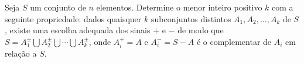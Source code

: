 Seja $S$ um conjunto de $n$ elementos.
Determine o menor inteiro positivo $k$ com a seguinte propriedade: dados quaisquer $k$ subconjuntos distintos $A_1, A_2, \dots, A_k$ de $S$, existe uma escolha adequada dos sinais $+$ e $-$ de modo que $S = A_1^\pm \bigcup A_2^\pm \bigcup \cdots \bigcup A_k^\pm$, onde $A_i^+ = A$ e $A_i^- = S - A$ é o complementar de $A_i$ em relação a $S$.